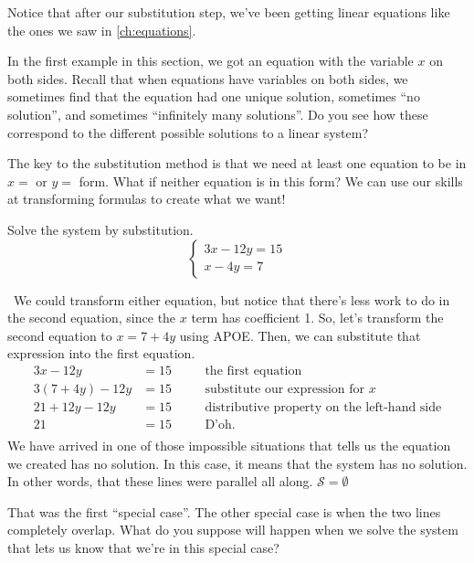 Notice that after our substitution step, we've been getting linear equations like the ones we saw in \cref{ch:equations}.

In the first example in this section, we got an equation with the variable $x$ on both sides. Recall that when equations have variables on both sides, we sometimes find that the equation had one unique solution, sometimes ``no solution'', and sometimes ``infinitely many solutions''. Do you see how these correspond to the different possible solutions to a linear system?

The key to the substitution method is that we need at least one equation to be in $x=$ or $y=$ form. What if neither equation is in this form? We can use our skills at transforming formulas to create what we want!

\begin{boxex}
Solve the system by substitution.
\[
\left\{%
\begin{array}{l}
3x-12y=15\\
x-4y=7
\end{array}
\right.
\] 

\exsoln\ We could transform either equation, but notice that there's less work to do in the second equation, since the $x$ term has coefficient 1. So, let's transform the second equation to $x=7+4y$ using APOE. Then, we can substitute that expression into the first equation.
\[\begin{aligned}
3x-12y &= 15
&& \quad\text{the first equation}\\
3(7+4y)-12y &= 15
&& \quad\text{substitute our expression for $x$}\\
21+12y-12y &= 15
&& \quad\text{distributive property on the left-hand side}\\
21 &= 15
&& \quad\text{D'oh.}\\
\end{aligned}\]
We have arrived in one of those impossible situations that tells us the equation we created has no solution. In this case, it means that the system has no solution. In other words, that these lines were parallel all along. $\mathcal{S}=\emptyset$
\end{boxex}

That was the first ``special case''. The other special case is when the two lines completely overlap. What do you suppose will happen when we solve the system that lets us know that we're in this special case?

